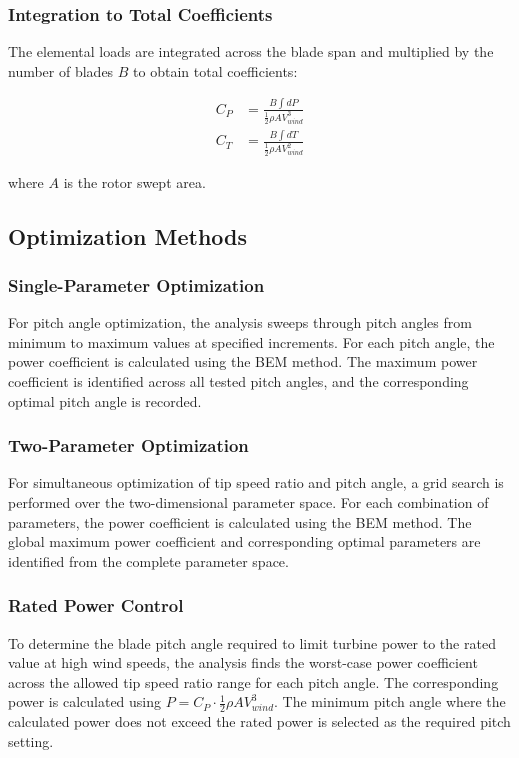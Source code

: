 \documentclass[11pt]{article}
\begin{document}
\subsubsection{Integration to Total Coefficients}

The elemental loads are integrated across the blade span and multiplied by the number of blades $B$ to obtain total coefficients:

\begin{align}
C_P &= \frac{B \int dP}{\frac{1}{2}\rho A V_{wind}^3} \\
C_T &= \frac{B \int dT}{\frac{1}{2}\rho A V_{wind}^2}
\end{align}

where $A$ is the rotor swept area.

\subsection{Optimization Methods}

\subsubsection{Single-Parameter Optimization}

For pitch angle optimization, the analysis sweeps through pitch angles from minimum to maximum values at specified increments. For each pitch angle, the power coefficient is calculated using the BEM method. The maximum power coefficient is identified across all tested pitch angles, and the corresponding optimal pitch angle is recorded.

\subsubsection{Two-Parameter Optimization}

For simultaneous optimization of tip speed ratio and pitch angle, a grid search is performed over the two-dimensional parameter space. For each combination of parameters, the power coefficient is calculated using the BEM method. The global maximum power coefficient and corresponding optimal parameters are identified from the complete parameter space.

\subsubsection{Rated Power Control}

To determine the blade pitch angle required to limit turbine power to the rated value at high wind speeds, the analysis finds the worst-case power coefficient across the allowed tip speed ratio range for each pitch angle. The corresponding power is calculated using $P = C_P \cdot \frac{1}{2}\rho A V_{wind}^3$. The minimum pitch angle where the calculated power does not exceed the rated power is selected as the required pitch setting.
\end{document}
